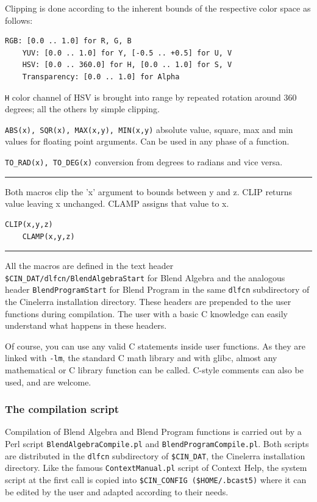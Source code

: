 Clipping is done according to the inherent bounds of the respective color space as follows:
\begin{lstlisting}[style=sh]
	RGB: [0.0 .. 1.0] for R, G, B
	YUV: [0.0 .. 1.0] for Y, [-0.5 .. +0.5] for U, V
	HSV: [0.0 .. 360.0] for H, [0.0 .. 1.0] for S, V
	Transparency: [0.0 .. 1.0] for Alpha
\end{lstlisting}
\texttt{H} color channel of HSV is brought into range by repeated rotation around 360 degrees; all the others by simple clipping. \newline

\texttt{ABS(x), SQR(x), MAX(x,y), MIN(x,y)} absolute value, square, max and min values for floating point arguments. Can be used in any phase of a function. \newline

\texttt{TO\_RAD(x), TO\_DEG(x)} conversion from degrees to radians and vice versa. \newline

\hrule
Both macros clip the 'x' argument to bounds between y and z. CLIP returns value leaving x unchanged. CLAMP assigns that value to x.
\begin{lstlisting}[style=sh]
	CLIP(x,y,z)
	CLAMP(x,y,z)
\end{lstlisting}
\hrule

All the macros are defined in the text header \texttt{\$CIN\_DAT/dlfcn/BlendAlgebraStart} for Blend Algebra and the analogous header \texttt{BlendProgramStart} for Blend Program in the same \texttt{dlfcn} subdirectory of the Cinelerra installation directory. These headers are prepended to the user functions during compilation. The user with a basic C knowledge can easily understand what happens in these headers.

Of course, you can use any valid C statements inside user functions. As they are linked with \texttt{-lm}, the standard C math library and with glibc, almost any mathematical or C library function can be called. C-style comments can also be used, and are welcome.

\subsubsection*{The compilation  script}
\label{ssub:compliation_script}

Compilation of Blend Algebra and Blend Program functions is carried out by a Perl script \texttt{BlendAlgebraCompile.pl} and \texttt{BlendProgramCompile.pl}. Both scripts are distributed in the \texttt{dlfcn} subdirectory of \texttt{\$CIN\_DAT}, the Cinelerra installation directory. Like the famous \texttt{ContextManual.pl} script of Context Help, the system script at the first call is copied into \texttt{\$CIN\_CONFIG (\$HOME/.bcast5)} where it can be edited by the user and adapted according to their needs.

